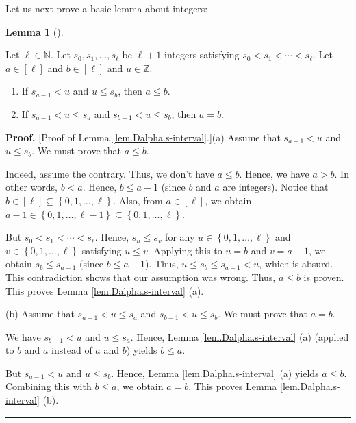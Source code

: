 \documentclass[numbers=enddot,12pt,final,onecolumn,notitlepage,abstracton]{scrartcl}
\theoremstyle{definition}
\newtheorem{lem}[theo]{Lemma}
\newenvironment{lemma}[1][]
{\begin{lem}[#1]\begin{leftbar}}
{\end{leftbar}\end{lem}}
\newenvironment{proof}[1][Proof]{\noindent\textbf{#1.} }{\ \rule{0.5em}{0.5em}}
\newenvironment{verlong}{}{}
\begin{document}
\begin{verlong}
\begin{footnotesize}
Let us next prove a basic lemma about integers:

\begin{lemma}
\label{lem.Dalpha.s-interval}Let $\ell\in\mathbb{N}$. Let $s_{0},s_{1}%
,\ldots,s_{\ell}$ be $\ell+1$ integers satisfying $s_{0}<s_{1}<\cdots<s_{\ell
}$. Let $a\in\left[  \ell\right]  $ and $b\in\left[  \ell\right]  $ and
$u\in\mathbb{Z}$.

\begin{enumerate}
\item[(a)] If $s_{a-1}<u$ and $u\leq s_{b}$, then $a\leq b$.

\item[(b)] If $s_{a-1}<u\leq s_{a}$ and $s_{b-1}<u\leq s_{b}$, then $a=b$.
\end{enumerate}
\end{lemma}

\begin{proof}
[Proof of Lemma \ref{lem.Dalpha.s-interval}.](a) Assume that $s_{a-1}<u$ and
$u\leq s_{b}$. We must prove that $a\leq b$.

Indeed, assume the contrary. Thus, we don't have $a\leq b$. Hence, we have
$a>b$. In other words, $b<a$. Hence, $b\leq a-1$ (since $b$ and $a$ are
integers). Notice that $b\in\left[  \ell\right]  \subseteq\left\{
0,1,\ldots,\ell\right\}  $. Also, from $a\in\left[  \ell\right]  $, we obtain
$a-1\in\left\{  0,1,\ldots,\ell-1\right\}  \subseteq\left\{  0,1,\ldots
,\ell\right\}  $.

But $s_{0}<s_{1}<\cdots<s_{\ell}$. Hence, $s_{u}\leq s_{v}$ for any
$u\in\left\{  0,1,\ldots,\ell\right\}  $ and $v\in\left\{  0,1,\ldots
,\ell\right\}  $ satisfying $u\leq v$. Applying this to $u=b$ and $v=a-1$, we
obtain $s_{b}\leq s_{a-1}$ (since $b\leq a-1$). Thus, $u\leq s_{b}\leq
s_{a-1}<u$, which is absurd. This contradiction shows that our assumption was
wrong. Thus, $a\leq b$ is proven. This proves Lemma
\ref{lem.Dalpha.s-interval} (a).

(b) Assume that $s_{a-1}<u\leq s_{a}$ and $s_{b-1}<u\leq s_{b}$. We must prove
that $a=b$.

We have $s_{b-1}<u$ and $u\leq s_{a}$. Hence, Lemma
\ref{lem.Dalpha.s-interval} (a) (applied to $b$ and $a$ instead of $a$ and
$b$) yields $b\leq a$.

But $s_{a-1}<u$ and $u\leq s_{b}$. Hence, Lemma \ref{lem.Dalpha.s-interval}
(a) yields $a\leq b$. Combining this with $b\leq a$, we obtain $a=b$. This
proves Lemma \ref{lem.Dalpha.s-interval} (b).
\end{proof}


\end{footnotesize}
\end{verlong}
\end{document}
